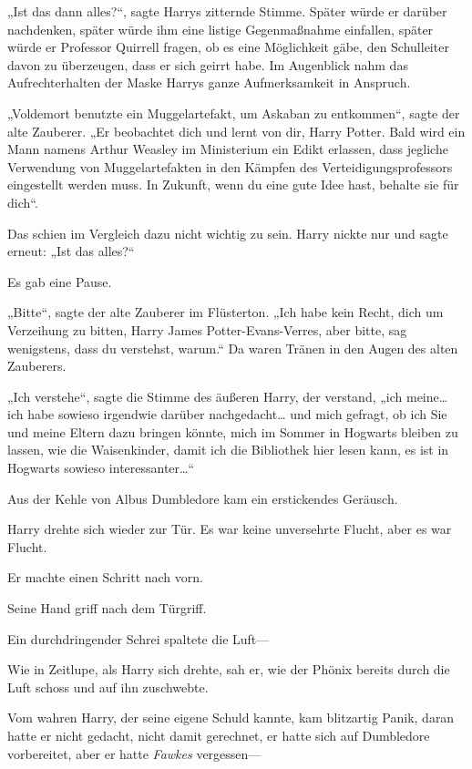 {„Ist das dann alles?“, sagte Harrys zitternde Stimme. Später würde er darüber nachdenken, später würde ihm eine listige Gegenmaßnahme einfallen, später würde er Professor Quirrell fragen, ob es eine Möglichkeit gäbe, den Schulleiter davon zu überzeugen, dass er sich geirrt habe. Im Augenblick nahm das Aufrechterhalten der Maske Harrys ganze Aufmerksamkeit in Anspruch.

„Voldemort benutzte ein Muggelartefakt, um Askaban zu entkommen“, sagte der alte Zauberer. „Er beobachtet dich und lernt von dir, Harry Potter. Bald wird ein Mann namens Arthur Weasley im Ministerium ein Edikt erlassen, dass jegliche Verwendung von Muggelartefakten in den Kämpfen des Verteidigungsprofessors eingestellt werden muss. In Zukunft, wenn du eine gute Idee hast, behalte sie für dich“.

Das schien im Vergleich dazu nicht wichtig zu sein. Harry nickte nur und sagte erneut: „Ist das alles?“

Es gab eine Pause.

„Bitte“, sagte der alte Zauberer im Flüsterton. „Ich habe kein Recht, dich um Verzeihung zu bitten, Harry James Potter-Evans-Verres, aber bitte, sag wenigstens, dass du verstehst, warum.“ Da waren Tränen in den Augen des alten Zauberers.

„Ich verstehe“, sagte die Stimme des äußeren Harry, der verstand, „ich meine… ich habe sowieso irgendwie darüber nachgedacht… und mich gefragt, ob ich Sie und meine Eltern dazu bringen könnte, mich im Sommer in Hogwarts bleiben zu lassen, wie die Waisenkinder, damit ich die Bibliothek hier lesen kann, es ist in Hogwarts sowieso interessanter…“

Aus der Kehle von Albus Dumbledore kam ein erstickendes Geräusch.

Harry drehte sich wieder zur Tür. Es war keine unversehrte Flucht, aber es war Flucht.

Er machte einen Schritt nach vorn.

Seine Hand griff nach dem Türgriff.

Ein durchdringender Schrei spaltete die Luft—

Wie in Zeitlupe, als Harry sich drehte, sah er, wie der Phönix bereits durch die Luft schoss und auf ihn zuschwebte.

Vom wahren Harry, der seine eigene Schuld kannte, kam blitzartig Panik, daran hatte er nicht gedacht, nicht damit gerechnet, er hatte sich auf Dumbledore vorbereitet, aber er hatte \emph{Fawkes} vergessen—

}
